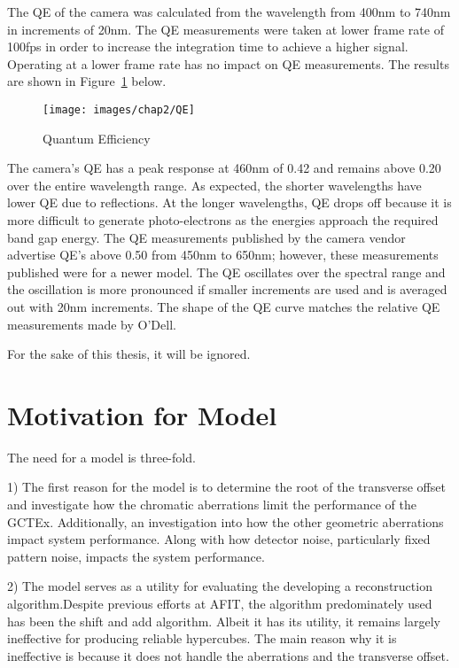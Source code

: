 The QE of the camera was calculated from the wavelength from 400nm to 740nm in increments of 20nm. The QE measurements were taken at lower frame rate of 100fps in order to increase the integration time to achieve a higher signal. Operating at a lower frame rate has no impact on QE measurements. The results are shown in Figure~\ref{fig:qePlot} below.

\begin{figure}[htb]
\begin{center}
\label{fig:qePlot}
\texttt{[image: images/chap2/QE]}
\caption{Quantum Efficiency}
\end{center}
\end{figure}

The camera's QE has a peak response at 460nm of 0.42 and remains above 0.20 over the entire wavelength range. As expected, the shorter wavelengths have lower QE due to reflections. At the longer wavelengths, QE drops off because it is more difficult to generate photo-electrons as the energies approach the required band gap energy. The QE measurements published by the camera vendor advertise QE's above 0.50 from 450nm to 650nm; however, these measurements published were for a newer model\cite{visionresearch}. The QE oscillates over the spectral range and the oscillation is more pronounced if smaller increments are used and is averaged out with 20nm increments. The shape of the QE curve matches the relative QE measurements made by O'Dell\cite{ODell}.

For the sake of this thesis, it will be ignored.

\section{Motivation for Model}

The need for a model is three-fold.

1) The first reason for the model is to determine the root of the transverse offset and investigate how the chromatic aberrations limit the performance of the GCTEx. Additionally, an investigation into how the other geometric aberrations impact system performance. Along with how detector noise, particularly fixed pattern noise, impacts the system performance.

2) The model serves as a utility for evaluating the developing a reconstruction algorithm.Despite previous efforts at AFIT, the algorithm predominately used has been the shift and add algorithm. Albeit it has its utility, it remains largely ineffective for producing reliable hypercubes. The main reason why it is ineffective is because it does not handle the aberrations and the transverse offset. 

